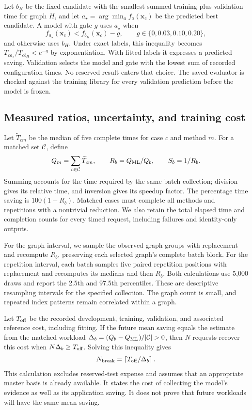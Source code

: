 Let $b_H$ be the fixed candidate with the smallest summed training-plus-validation time for graph $H$, and let $a_\star=\arg\min_a f_a(\boldsymbol x_c)$ be the predicted best candidate. A model with gate $g$ uses $a_\star$ when
\begin{equation}
 f_{a_\star}(\boldsymbol x_c)<f_{b_H}(\boldsymbol x_c)-g,
 \qquad g\in\{0,0.03,0.10,0.20\},
\label{eq:bounds-gate}
\end{equation}
and otherwise uses $b_H$. Under exact labels, this inequality becomes $T_{ca_\star}/T_{cb_H}<e^{-g}$ by exponentiation. With fitted labels it expresses a predicted saving. Validation selects the model and gate with the lowest sum of recorded configuration times. No reserved result enters that choice. The saved evaluator is checked against the training library for every validation prediction before the model is frozen.

\subsection{Measured ratios, uncertainty, and training cost}
Let $\widetilde T_{cm}$ be the median of five complete times for case $c$ and method $m$. For a matched set $\mathcal C$, define
\begin{equation}
 Q_m=\sum_{c\in\mathcal C}\widetilde T_{cm},\qquad
 R_b=Q_{\rm ML}/Q_b,\qquad S_b=1/R_b.
\label{eq:bounds-times}
\end{equation}
Summing accounts for the time required by the same batch collection; division gives its relative time, and inversion gives its speedup factor. The percentage time saving is $100(1-R_b)$. Matched cases must complete all methods and repetitions with a nontrivial reduction. We also retain the total elapsed time and completion counts for every timed request, including failures and identity-only outputs.

For the graph interval, we sample the observed graph groups with replacement and recompute $R_b$, preserving each selected graph's complete batch block. For the repetition interval, each batch samples five paired repetition positions with replacement and recomputes its medians and then $R_b$. Both calculations use 5,000 draws and report the 2.5th and 97.5th percentiles. These are descriptive resampling intervals for the specified collection. The graph count is small, and repeated index patterns remain correlated within a graph.

Let $T_{\rm off}$ be the recorded development, training, validation, and associated reference cost, including fitting. If the future mean saving equals the estimate from the matched workload $\Delta_b=(Q_b-Q_{\rm ML})/|\mathcal C|>0$, then $N$ requests recover this cost when $N\Delta_b\geq T_{\rm off}$. Solving this inequality gives
\begin{equation}
 N_{\rm break}=\left\lceil T_{\rm off}/\Delta_b\right\rceil.
\end{equation}
This calculation excludes reserved-test expense and assumes that an appropriate master basis is already available. It states the cost of collecting the model's evidence as well as its application saving. It does not prove that future workloads will have the same mean saving.
